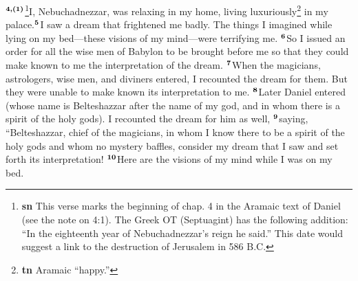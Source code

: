 \documentclass[12pt,a4paper,final]{article}
\renewcommand{\textsuperscript}[1]{\ensuremath{^{\textbf{\scriptsize #1}}}}
\begin{document}
\textsuperscript{4,(1)}\footnote{\textbf{sn} This verse marks the beginning of chap. 4 in the Aramaic text of Daniel (see the note on 4:1). The Greek OT (Septuagint) has the following addition: “In the eighteenth year of Nebuchadnezzar’s reign he said.” This date would suggest a link to the destruction of Jerusalem in 586 B.C.}I, Nebuchadnezzar, was relaxing in my home, living luxuriously\footnote{\textbf{tn} Aramaic “happy.”} in my palace.\textsuperscript{5}I saw a dream that frightened me badly. The things I imagined while lying on my bed—these visions of my mind—were terrifying me. \textsuperscript{6}So I issued an order for all the wise men of Babylon to be brought before me so that they could make known to me the interpretation of the dream. \textsuperscript{7}When the magicians, astrologers, wise men, and diviners entered, I recounted the dream for them. But they were unable to make known its interpretation to me. \textsuperscript{8}Later Daniel entered (whose name is Belteshazzar after the name of my god, and in whom there is a spirit of the holy gods). I recounted the dream for him as well, \textsuperscript{9}saying, “Belteshazzar, chief of the magicians, in whom I know there to be a spirit of the holy gods and whom no mystery baffles, consider my dream that I saw and set forth its interpretation! \textsuperscript{10}Here are the visions of my mind while I was on my bed. 
\end{document}
